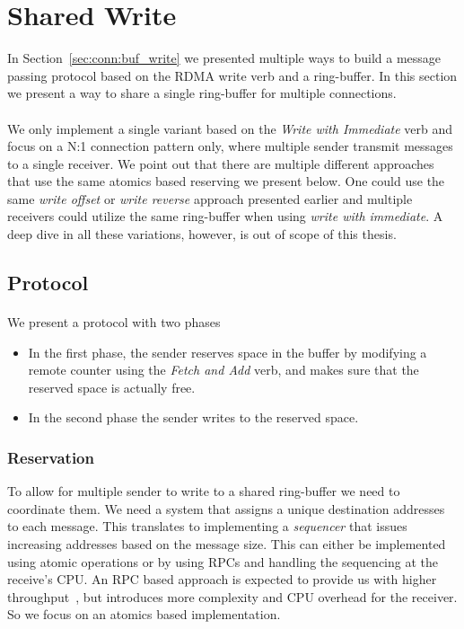 \section{Shared Write} \label{sec:conn:shared_write}
In Section~\ref{sec:conn:buf_write} we presented multiple ways to build a message passing protocol based on the 
RDMA write verb and a ring-buffer. In this section we present a way to share a single ring-buffer for multiple connections.

\paragraph{} We only implement a single variant based on the \emph{Write with Immediate} verb and focus on a N:1 connection pattern only,
where multiple sender transmit messages to a single receiver.
We point out that there are multiple different approaches that use the same atomics based reserving we present below. One
could use the same \emph{write offset} or \emph{write reverse} approach presented earlier and multiple receivers could
utilize the same ring-buffer when using \emph{write with immediate}. A deep dive in all these variations, however, is out
of scope of this thesis.

\subsection{Protocol}

\paragraph{} We present a protocol with two phases

\begin{itemize}
  \item In the first phase, the sender reserves space in the buffer by modifying a remote counter using 
    the \emph{Fetch and Add} verb, and makes sure that the reserved space is actually free.
  \item In the second phase the sender writes to the reserved space.
\end{itemize}
\subsubsection{Reservation}
To allow for multiple sender to write to a shared ring-buffer we need to coordinate them. We need a system that 
assigns a unique destination addresses to each message. This translates to implementing a \emph{sequencer} that issues
increasing addresses based on the message size. This can either be implemented using atomic operations or by using RPCs
and handling the sequencing at the receive's CPU. An RPC based approach is expected to provide us with higher 
throughput~\cite{anuj-guide}, but introduces more complexity and CPU overhead for the receiver. So we focus on an atomics based 
implementation.

